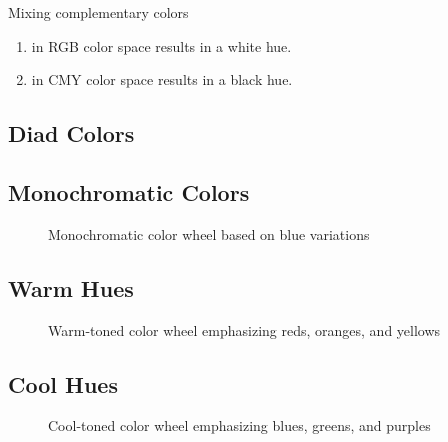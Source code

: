   \begin{theorem}
    \label{thm:mixing-complementary-colors}
    Mixing complementary colors 
    \begin{enumerate}
      \item in RGB color space results in a white hue. 
      \item in CMY color space results in a black hue. 
    \end{enumerate}
  \end{theorem}

\subsection{Diad Colors} 

\subsection{Monochromatic Colors}

  \begin{example}
    \label{ex:monochromatic-blue}
    \begin{figure}[H]
      \centering 
      \caption{Monochromatic color wheel based on blue variations} 
    \end{figure}
  \end{example}

\subsection{Warm Hues} 

  \begin{example}
    \label{ex:warm-tones}
    \begin{figure}[H]
      \centering 
      \caption{Warm-toned color wheel emphasizing reds, oranges, and yellows} 
    \end{figure}
  \end{example}

\subsection{Cool Hues}

  \begin{example}
    \label{ex:cool-tones}
    \begin{figure}[H]
      \centering 
      \caption{Cool-toned color wheel emphasizing blues, greens, and purples} 
    \end{figure}
  \end{example}

